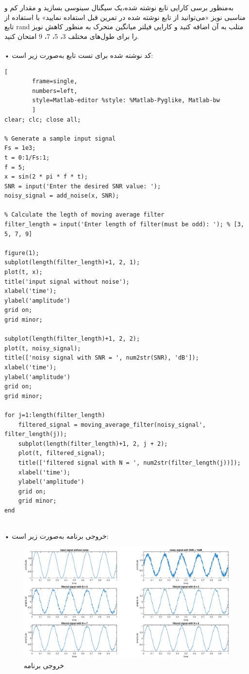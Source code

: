 \documentclass[12pt]{exam}
\begin{document}
\begin{questions}
\question
به‌منظور برسی کارایی تابع نوشته شده،‌یک سیگنال سینوسی بسازید و مقدار کم و مناسبی نویز «می‌توانید از تابع نوشته شده در تمرین قبل استفاده نمایید» با استفاده از تابع rand متلب به آن اضافه کنید و کارایی فیلتر میانگین متحرک به منظور کاهش نویز را برای طول‌های مختلف 3، 5، 7، 9 امتحان کنید. \\
\\

• کد نوشته شده برای تست تابع به‌صورت زیر است: 
\begin{latin}
	\begin{lstlisting}[
		frame=single,
		numbers=left,
		style=Matlab-editor %style: %Matlab-Pyglike, Matlab-bw
		] 
clear; clc; close all;

% Generate a sample input signal
Fs = 1e3;
t = 0:1/Fs:1;
f = 5;
x = sin(2 * pi * f * t);
SNR = input('Enter the desired SNR value: ');
noisy_signal = add_noise(x, SNR);

% Calculate the legth of moving average filter
filter_length = input('Enter length of filter(must be odd): '); % [3, 5, 7, 9]

figure(1);
subplot(length(filter_length)+1, 2, 1);
plot(t, x);
title('input signal without noise');
xlabel('time');
ylabel('amplitude')
grid on;
grid minor;

subplot(length(filter_length)+1, 2, 2);
plot(t, noisy_signal);
title(['noisy signal with SNR = ', num2str(SNR), 'dB']);
xlabel('time');
ylabel('amplitude')
grid on;
grid minor;

for j=1:length(filter_length)
	filtered_signal = moving_average_filter(noisy_signal', filter_length(j));
	subplot(length(filter_length)+1, 2, j + 2);
	plot(t, filtered_signal);
	title(['filtered signal with N = ', num2str(filter_length(j))]);
	xlabel('time');
	ylabel('amplitude')
	grid on;
	grid minor;
end
		
\end{lstlisting}
\end{latin}

• خروجی برنامه به‌صورت زیر است: 
\begin{figure}[t]
	\centering
	\includegraphics[width=1\textwidth]{images/Result}
	\caption{خروجی برنامه}
\end{figure}


\end{questions}
\end{document}

